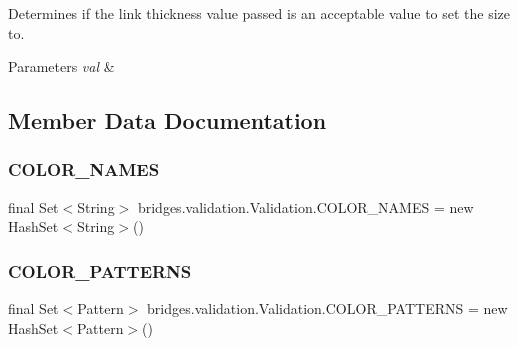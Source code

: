 Determines if the link thickness value passed is an acceptable value to set the size to.


\begin{DoxyParams}{Parameters}
{\em val} & \\
\hline
\end{DoxyParams}


\subsection{Member Data Documentation}
\hypertarget{classbridges_1_1validation_1_1_validation_a580ab67e2b85bc3ee6ee8af138180624}{}\label{classbridges_1_1validation_1_1_validation_a580ab67e2b85bc3ee6ee8af138180624} 
\subsubsection{\texorpdfstring{C\+O\+L\+O\+R\+\_\+\+N\+A\+M\+ES}{COLOR\_NAMES}}
{\footnotesize\ttfamily final Set$<$String$>$ bridges.\+validation.\+Validation.\+C\+O\+L\+O\+R\+\_\+\+N\+A\+M\+ES = new Hash\+Set$<$String$>$()\hspace{0.3cm}{\ttfamily [static]}}

\hypertarget{classbridges_1_1validation_1_1_validation_a16e87ec9f7fe5ef76aea76277a612c76}{}\label{classbridges_1_1validation_1_1_validation_a16e87ec9f7fe5ef76aea76277a612c76} 
\subsubsection{\texorpdfstring{C\+O\+L\+O\+R\+\_\+\+P\+A\+T\+T\+E\+R\+NS}{COLOR\_PATTERNS}}
{\footnotesize\ttfamily final Set$<$Pattern$>$ bridges.\+validation.\+Validation.\+C\+O\+L\+O\+R\+\_\+\+P\+A\+T\+T\+E\+R\+NS = new Hash\+Set$<$Pattern$>$()\hspace{0.3cm}{\ttfamily [static]}}

\hypertarget{classbridges_1_1validation_1_1_validation_a43f1f9efc20d0086b7fcfa9b40bd7146}{}\label{classbridges_1_1validation_1_1_validation_a43f1f9efc20d0086b7fcfa9b40bd7146} 
